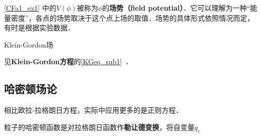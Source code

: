 \autoref{CFa1_ex1} 中的$V(\phi)$被称为$\phi$的\textbf{场势（field potential）}．它可以理解为一种“能量密度”，各点的场势取决于这个点上场的取值．场势的具体形式依照情况而定，有时是根据实验数据．



\begin{example}{Klein-Gordon场}

见\textbf{Klein-Gordon方程}的\autoref{KGeq_sub1}~．

\end{example}




\subsection{哈密顿场论}


相比欧拉-拉格朗日方程，实际中应用更多的是正则方程．

粒子的哈密顿函数是对拉格朗日函数作\textbf{勒让德变换}，将自变量$\dot{q}_r$

























